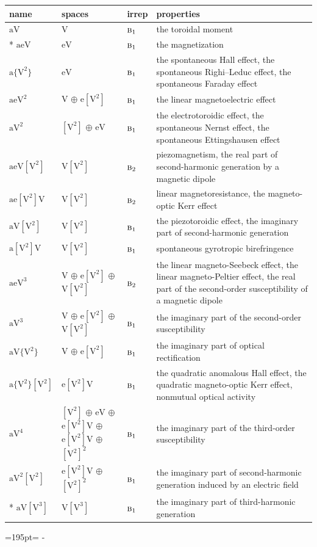 \documentclass[10pt,a4paper]{article}
\newcommand{\needspace}[1]{\par\penalty-100\begingroup\dimen0=#1\relax\dimen2=\pagegoal
  \advance\dimen2-\pagetotal\ifdim\dimen0>\dimen2\relax\ifdim\dimen2>0pt\vfil\break\fi\fi
  \endgroup}
\numberwithin{equation}{section}
\newcommand{\irr}[1]{\text{\normalfont\scshape #1}}
\newcommand{\jahn}[1]{\mathrm{#1}}
\newlength{\fillwidth}\newlength{\cellwidth}\newlength{\colwidth}
\begin{document}
{\begin{longtable}{@{}lll>{\RaggedRight\arraybackslash}p{\fillwidth}@{}}
name & spaces & irrep & properties\\\midrule\endhead
\bottomrule\endfoot\endlastfoot
$\jahn{aV}$ & $\jahn{V}$ & $\irr{b}_{1}$ & the toroidal moment\\*
$\jahn{aeV}$ & $\jahn{eV}$ & $\irr{b}_{1}$ & the magnetization\\
$\jahn{a\{V^{2}\}}$ & $\jahn{eV}$ & $\irr{b}_{1}$ & the spontaneous Hall effect, the spontaneous Righi–Leduc effect, the spontaneous Faraday effect\\
$\jahn{aeV^{2}}$ & $\jahn{V}$ $\oplus$ $\jahn{e[V^{2}]}$ & $\irr{b}_{1}$ & the linear magnetoelectric effect\\
$\jahn{aV^{2}}$ & $\jahn{[V^{2}]}$ $\oplus$ $\jahn{eV}$ & $\irr{b}_{1}$ & the electrotoroidic effect, the spontaneous Nernst effect, the spontaneous Ettingshausen effect\\
$\jahn{aeV[V^{2}]}$ & $\jahn{V[V^{2}]}$ & $\irr{b}_{2}$ & piezomagnetism, the real part of second-harmonic generation by a magnetic dipole\\
$\jahn{ae[V^{2}]V}$ & $\jahn{V[V^{2}]}$ & $\irr{b}_{2}$ & linear magnetoresistance, the magneto-optic Kerr effect\\
$\jahn{aV[V^{2}]}$ & $\jahn{V[V^{2}]}$ & $\irr{b}_{1}$ & the piezotoroidic effect, the imaginary part of second-harmonic generation\\
$\jahn{a[V^{2}]V}$ & $\jahn{V[V^{2}]}$ & $\irr{b}_{1}$ & spontaneous gyrotropic birefringence\\
$\jahn{aeV^{3}}$ & $\jahn{V}$ $\oplus$ $\jahn{e[V^{2}]}$ $\oplus$ $\jahn{V[V^{2}]}$ & $\irr{b}_{2}$ & the linear magneto-Seebeck effect, the linear magneto-Peltier effect, the real part of the second-order susceptibility of a magnetic dipole\\
$\jahn{aV^{3}}$ & $\jahn{V}$ $\oplus$ $\jahn{e[V^{2}]}$ $\oplus$ $\jahn{V[V^{2}]}$ & $\irr{b}_{1}$ & the imaginary part of the second-order susceptibility\\
$\jahn{aV\{V^{2}\}}$ & $\jahn{V}$ $\oplus$ $\jahn{e[V^{2}]}$ & $\irr{b}_{1}$ & the imaginary part of optical rectification\\
$\jahn{a\{V^{2}\}[V^{2}]}$ & $\jahn{e[V^{2}]V}$ & $\irr{b}_{1}$ & the quadratic anomalous Hall effect, the quadratic magneto-optic Kerr effect, nonmutual optical activity\\
$\jahn{aV^{4}}$ & $\jahn{[V^{2}]}$ $\oplus$ $\jahn{eV}$ $\oplus$ $\jahn{e[V^{2}]V}$ $\oplus$ $\jahn{e[V^{2}]V}$ $\oplus$ $\jahn{[V^{2}]^{2}}$ & $\irr{b}_{1}$ & the imaginary part of the third-order susceptibility\\
$\jahn{aV^{2}[V^{2}]}$ & $\jahn{e[V^{2}]V}$ $\oplus$ $\jahn{[V^{2}]^{2}}$ & $\irr{b}_{1}$ & the imaginary part of second-harmonic generation induced by an electric field\\*
$\jahn{aV[V^{3}]}$ & $\jahn{V[V^{3}]}$ & $\irr{b}_{1}$ & the imaginary part of third-harmonic generation\\
\bottomrule\end{longtable}}
\needspace{195pt}
\end{document}
